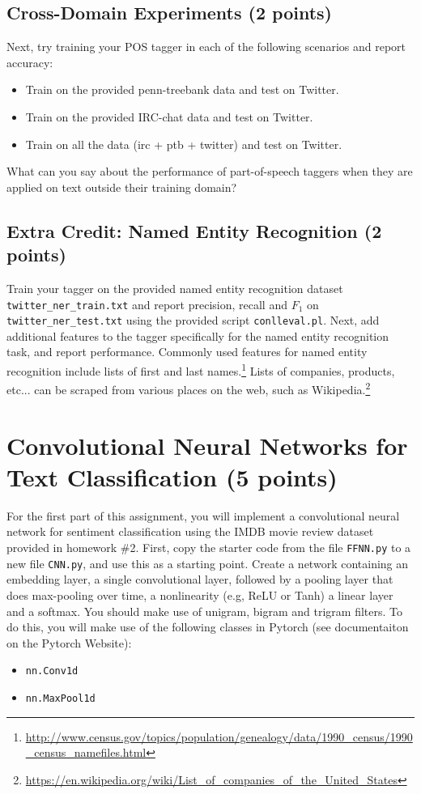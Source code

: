 \documentclass[12pt, letterpaper]{article}
\begin{document}
\subsection*{Cross-Domain Experiments (2 points)}
Next, try training your POS tagger in each of the following scenarios and report accuracy:

\begin{itemize}
  \item Train on the provided penn-treebank data and test on Twitter.
  \item Train on the provided IRC-chat data and test on Twitter.
  \item Train on all the data (irc + ptb + twitter) and test on Twitter.
\end{itemize}

What can you say about the performance of part-of-speech taggers when they are applied on text outside their
training domain?

\subsection*{Extra Credit: Named Entity Recognition (2 points)}
Train your tagger on the provided named entity recognition dataset {\tt twitter\_ner\_train.txt} and report
precision, recall and $F_1$ on {\tt twitter\_ner\_test.txt} using the provided script {\tt conlleval.pl}.
Next, add additional features to the tagger specifically for the named entity recognition task, and report performance.
Commonly used features for named entity recognition include lists of first and last names.\footnote{\url{http://www.census.gov/topics/population/genealogy/data/1990\_census/1990\_census\_namefiles.html}}
Lists of companies, products, etc... can be scraped from various places on the web, such as Wikipedia.\footnote{\url{https://en.wikipedia.org/wiki/List\_of\_companies\_of\_the\_United\_States}}


\section{Convolutional Neural Networks for Text Classification (5 points)}
For the first part of this assignment, you will implement a convolutional neural network for sentiment classification using the IMDB movie review dataset provided in homework \#2.
First, copy the starter code from the file {\tt FFNN.py} to a new file {\tt CNN.py}, and use this as a starting point.  Create a network containing an embedding layer, a single
convolutional layer, followed by a pooling layer that does max-pooling over time, a nonlinearity (e.g, ReLU or Tanh) a linear layer and a softmax.  You should make use of unigram, bigram and trigram filters.
To do this, you will make use
of the following classes in Pytorch (see documentaiton on the Pytorch Website):
\begin{itemize}
  \item {\tt nn.Conv1d}
  \item {\tt nn.MaxPool1d}
\end{itemize}
\end{document}
